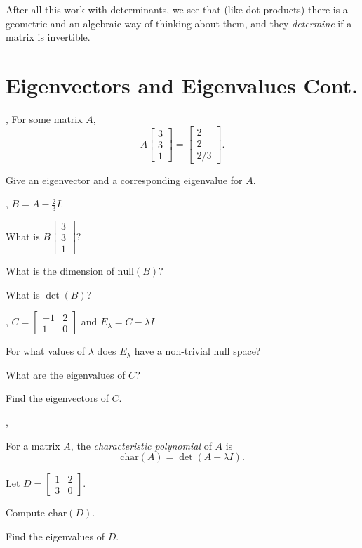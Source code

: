 \documentclass{article}
\newcommand{\mat}[1]{\begin{bmatrix}#1\end{bmatrix}}
\newcommand{\chr}{\mathrm{char}}
\begin{document}
	After all this work with determinants, we see 
	that (like dot products) there is a geometric and an
	algebraic way of thinking about them, and they 
	\emph{determine} if a matrix is invertible.

\newpage
\section*{Eigenvectors and Eigenvalues Cont.}

	\sep
	For some matrix $A$,
	\[
		A\mat{3\\3\\1}=\mat{2\\2\\2/3}.
	\]
	\begin{Enum}
		\item Give an eigenvector and a corresponding eigenvalue for $A$.
	\end{Enum}

	\sep
	$B=A-\frac{2}{3}I$.
	\begin{Enum}
		\item What is $B\mat{3\\3\\1}$?
		\item What is the dimension of $\text{null}(B)$?
		\item What is $\det(B)$?
	\end{Enum}

	\sep
	$C=\mat{-1&2\\1&0}$ and $E_\lambda = C-\lambda I$
	\begin{Enum}
		\item For what values of $\lambda$ does $E_\lambda$ have a non-trivial
			null space?
		\item What are the eigenvalues of $C$?
		\item Find the eigenvectors of $C$.
	\end{Enum}
	
	\sep
	\begin{Def}
	For a matrix $A$, the \emph{characteristic polynomial} of $A$ is
	\[
		\chr(A)=\det(A-\lambda I).
	\]
	\vspace{-.3in}
	\end{Def}

	\vspace{.2in}
	Let $D=\mat{1&2\\3&0}$.
	\begin{Enum}
		\item Compute $\chr(D)$.
		\item Find the eigenvalues of $D$.
	\end{Enum}
\end{document}
